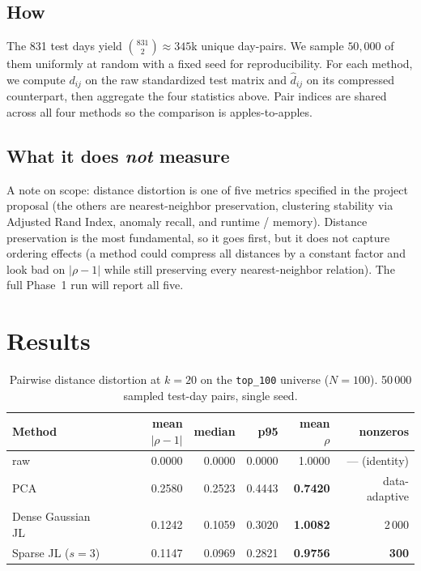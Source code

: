\documentclass[11pt]{article}
\begin{document}
\subsection{How}

The 831 test days yield $\binom{831}{2} \approx 345$k unique day-pairs. We sample $50{,}000$ of them uniformly at random with a fixed seed for reproducibility. For each method, we compute $d_{ij}$ on the raw standardized test matrix and $\hat{d}_{ij}$ on its compressed counterpart, then aggregate the four statistics above. Pair indices are shared across all four methods so the comparison is apples-to-apples.

\subsection{What it does \emph{not} measure}

A note on scope: distance distortion is one of five metrics specified in the project proposal (the others are nearest-neighbor preservation, clustering stability via Adjusted Rand Index, anomaly recall, and runtime / memory). Distance preservation is the most fundamental, so it goes first, but it does not capture ordering effects (a method could compress all distances by a constant factor and look bad on $|\rho - 1|$ while still preserving every nearest-neighbor relation). The full Phase~1 run will report all five.

\section{Results}

\begin{table}[H]
\centering
\caption{Pairwise distance distortion at $k = 20$ on the \texttt{top\_100} universe ($N=100$). 50\,000 sampled test-day pairs, single seed.}
\begin{tabular}{lrrrrr}
\toprule
\textbf{Method} & \textbf{mean $|\rho - 1|$} & \textbf{median} & \textbf{p95} & \textbf{mean $\rho$} & \textbf{nonzeros} \\
\midrule
raw           & 0.0000 & 0.0000 & 0.0000 & 1.0000 & --- (identity) \\
PCA           & 0.2580 & 0.2523 & 0.4443 & \textbf{0.7420} & data-adaptive \\
Dense Gaussian JL & 0.1242 & 0.1059 & 0.3020 & \textbf{1.0082} & 2\,000 \\
Sparse JL ($s=3$) & 0.1147 & 0.0969 & 0.2821 & \textbf{0.9756} & \textbf{300} \\
\bottomrule
\end{tabular}
\end{table}
\end{document}
